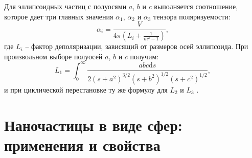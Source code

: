 Для эллипсоидных частиц с полуосями $ a $, $ b $ и $ c $ выполняется соотношение, которое дает три главных значения $ \alpha_1 $, $ \alpha_2 $ и $ \alpha_3 $ тензора поляризуемости:
\begin{equation}
\alpha _i = \frac{V}{4 \pi (L_i + \frac{1}{m^2 - 1})},
\label{eq:polarizabilityEllip}
\end{equation}
где $ L_i $ -- фактор деполяризации, зависящий от размеров осей эллипсоида. При произвольном выборе полуосей $ a $, $ b $ и $ c $ получим:
\begin{equation}
L_1 = \int_0^\infty \frac{a b c \mathrm{d} s}{2 (s + a^2)^{3/2} (s + b^2)^{1/2} (s + c^2)^{1/2}},
\label{eq:Lfactor}
\end{equation}
и при циклической перестановке ту же формулу для $ L_2 $ и $ L_3 $ \cite{LPP_Hulst}.

\section{Наночастицы в виде сфер: применения и свойства}

